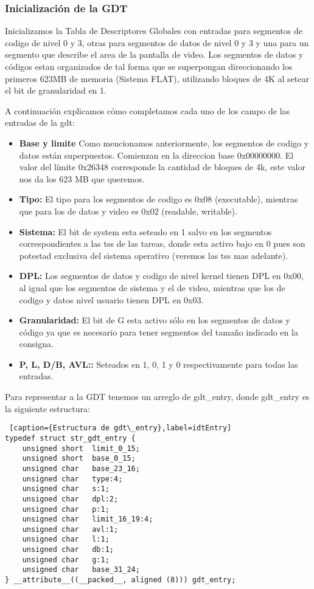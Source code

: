 \subsubsection*{Inicializaci\'on de la GDT}
\par{Inicializamos la Tabla de Descriptores Globales con entradas para segmentos de codigo de nivel 0 y 3, otras para segmentos de datos de nivel 0 y 3 y una para un segmento que describe el area de la pantalla de video. Los segmentos de datos y c\'odigos estan organizados de tal forma que se superpongan direccionando los primeros 623MB de memoria (Sistema FLAT), utilizando bloques de 4K al setear el bit de granularidad en 1.}
\par{A continuaci\'on explicamos c\'omo completamos cada uno de los campo de las entradas de la gdt:}
\begin{itemize}
    \item \textbf{Base y limite} Como mencionamos anteriormente, los segmentos de codigo y datos est\'an superpuestos. Comienzan en la direccion base 0x00000000. El valor del l\'imite 0x26348 corresponde la cantidad de bloques de 4k, este valor nos da los 623 MB que queremos.
    \item \textbf{Tipo:}  El tipo para los segmentos de codigo es 0x08 (executable), mientras que para los de datos y video es 0x02 (readable, writable).
    \item \textbf{Sistema:}  El bit de system esta seteado en 1 salvo en los segmentos correspondientes a las tss de las tareas, donde esta activo bajo en 0 pues son potestad exclusiva del sistema operativo (veremos las tss mas adelante).
    \item \textbf{DPL:}   Los segmentos de datos y codigo de nivel kernel tienen DPL en 0x00, al igual que los segmentos de sistema y el de video, mientras que los de codigo y datos nivel usuario tienen DPL en 0x03.    
    \item \textbf{Granularidad:} El bit de G esta activo s\'olo en los segmentos de datos y c\'odigo ya que es necesario para tener segmentos del tamaño indicado en la consigna.
    \item \textbf{P, L, D/B, AVL::}  Seteados en 1, 0, 1 y 0 respectivamente para todas las entradas.
\end{itemize}

\par{Para representar a la GDT tenemos un arreglo de gdt\_entry, donde gdt\_entry es la siguiente estructura:}

\begin{lstlisting} [caption={Estructura de gdt\_entry},label=idtEntry]
typedef struct str_gdt_entry {
    unsigned short  limit_0_15;
    unsigned short  base_0_15;
    unsigned char   base_23_16;
    unsigned char   type:4;
    unsigned char   s:1;
    unsigned char   dpl:2;
    unsigned char   p:1;
    unsigned char   limit_16_19:4;
    unsigned char   avl:1;
    unsigned char   l:1;
    unsigned char   db:1;
    unsigned char   g:1;
    unsigned char   base_31_24;
} __attribute__((__packed__, aligned (8))) gdt_entry;
\end{lstlisting}

